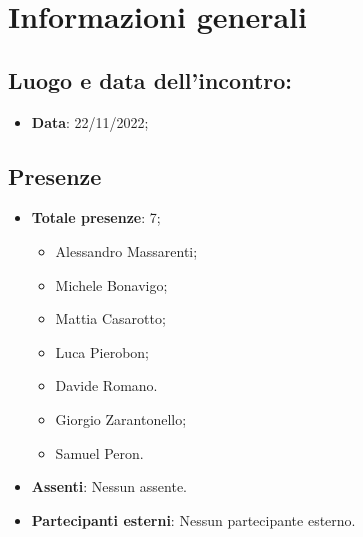 \section{Informazioni generali}
    \subsection{Luogo e data dell'incontro:}
    \begin{itemize}
        \item \textbf{Data}: 22/11/2022;
    \end{itemize}
    \subsection{Presenze}
    \begin{itemize}
        \item \textbf{Totale presenze}: 7;
        \begin{itemize}
            \item Alessandro Massarenti;
            \item Michele Bonavigo;
            \item Mattia Casarotto;
            \item Luca Pierobon;
            \item Davide Romano.
            \item Giorgio Zarantonello;
            \item Samuel Peron.
        \end{itemize}
        \item \textbf{Assenti}: Nessun assente.
        \item \textbf{Partecipanti esterni}: Nessun partecipante esterno.
    \end{itemize}
